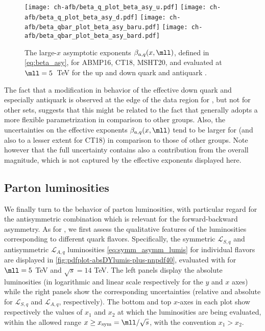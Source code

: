 \begin{figure}[!t]
 \centering
 \texttt{[image: ch-afb/beta\_q\_plot\_beta\_asy\_u.pdf]}
 \texttt{[image: ch-afb/beta\_q\_plot\_beta\_asy\_d.pdf]}
 \texttt{[image: ch-afb/beta\_qbar\_plot\_beta\_asy\_baru.pdf]}
 \texttt{[image: ch-afb/beta\_qbar\_plot\_beta\_asy\_bard.pdf]}
 \caption{\small 
   The large-$x$ asymptotic exponents $\beta_{a,q}(x,\mll)$, defined in
   \cref{eq:beta_asy}, for ABMP16, CT18, MSHT20, and  evaluated at
   $\mll=5$~TeV for the up and down quark and antiquark \pdfs.
 }
 \label{fig:asy_exponents}
\end{figure}

The fact that a modification in behavior of the effective down quark
and especially antiquark \pdfs is observed at the edge of the data
region for , but not for other \pdf sets, suggests that this
might be related to the fact that   generally adopts a more
flexible \pdf parametrization in comparison to other groups.
%
Also, the  uncertainties on the effective exponents
$\beta_{a,q}(x,\mll)$ tend to be larger for  (and also to a
lesser extent for CT18) in comparison to those of other groups.
Note however that the full \pdf uncertainty contains also a
contribution from the overall 
magnitude, which is not captured by the effective exponents displayed here.

\subsection{Parton luminosities}
\label{subsec:partoniclumis}

We finally turn to the behavior of parton luminosities, with
particular regard for the antisymmetric combination which is relevant
for the forward-backward asymmetry.
As for \pdfs, we first assess the qualitative features of the
luminosities corresponding to different quark flavors.
Specifically, the symmetric $\mathcal{L}_{S,q}$ and antisymmetric
$\mathcal{L}_{A,q}$ luminosities
\cref{eq:symm_asymm_lumis}  for individual flavors are
displayed in \cref{fig:pdfplot-absDYlumis-plus-nnpdf40},
evaluated with  \nnlo for $\mll=5$ TeV and $\sqrt{s}=14$ TeV.
%
The left panels display the absolute luminosities (in logarithmic and
linear scale respectively
for the $y$ and $x$ axes)
while the right panels show the corresponding \pdf uncertainties (relative and absolute for
$\mathcal{L}_{S,q}$ and $\mathcal{L}_{A,q}$, respectively).
%
The bottom  and top $x$-axes in each plot show respectively the values
of $x_1$ and $x_2$  at which the
luminosities are being evaluated, within the allowed range
$x \ge x_{\rm sym}=\mll/\sqrt{s}$, with the convention $x_1>x_2$.

